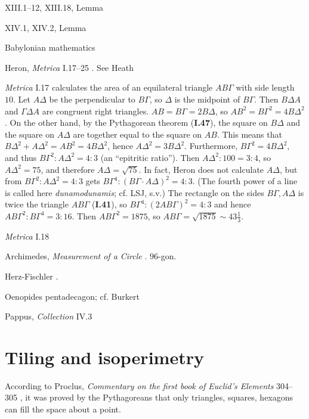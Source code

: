 \documentclass{article}
\begin{document}
XIII.1--12, XIII.18, Lemma

XIV.1, XIV.2, Lemma

Babylonian mathematics \cite{friberg}

Heron, {\em Metrica} I.17--25 \cite[pp.~190--]{metrica}. See Heath \cite[pp.~326--329]{HGMII}

{\em Metrica} I.17 calculates the area of an equilateral  triangle $AB\Gamma$ with side length $10$. 
Let $A\Delta$ be the perpendicular to $B\Gamma$, so $\Delta$ is the midpoint of $B\Gamma$. Then
$B\Delta A$ and $\Gamma \Delta A$ are congruent right triangles.
$AB=B\Gamma =2 B\Delta$,  so
$AB^2 = B\Gamma^2 = 4B\Delta^2$.
On the other hand,
by the Pythagorean theorem (\textbf{I.47}), the square on $B\Delta$ and the square
on $A \Delta$ are together equal to the square on $AB$. This means that
$B\Delta^2+A\Delta^2 = AB^2 = 4B\Delta^2$, hence
$A\Delta^2 = 3 B\Delta^2$.
Furthermore,  $B\Gamma^2=4B\Delta^2$, and thus
$B\Gamma^2 : A\Delta^2 = 4:3$ (an ``epitritic ratio'').
Then $A\Delta^2 : 100 = 3:4$, so $A\Delta^2 = 75$, and therefore $A\Delta = \sqrt{75}$. 
In fact, Heron does not calculate $A\Delta$, but from
$B\Gamma^2 : A\Delta^2 = 4:3$ gets 
$B\Gamma^4 : (B\Gamma \cdot A\Delta)^2 = 4:3$. (The fourth power of a line is called here {\em dunamodunamis}; cf. LSJ, s.v.)
The rectangle on the sides $B\Gamma,A\Delta$ is twice the triangle
$AB\Gamma$ (\textbf{I.41}), so 
$B\Gamma^4 : (2AB\Gamma)^2 = 4:3$ and hence
$AB\Gamma^2: B\Gamma^4  = 3:16$.
Then $AB{\Gamma}^2 = 1875$, so
$AB\Gamma = \sqrt{1875} \sim 43 \frac{1}{3}$. 

{\em Metrica} I.18



Archimedes, {\em Measurement of a Circle} \cite{archimedes}. $96$-gon.





Herz-Fischler \cite{herz-fischler}.

Oenopides \cite[p.~131, n.~4]{aristarchus} pentadecagon; cf. Burkert \cite[p.~453]{burkert}

Pappus, {\em Collection} IV.3 \cite[pp.~86--87]{pappusIV}







\section{Tiling and isoperimetry}
According to Proclus, {\em Commentary on the first book of Euclid's Elements} 304--305 \cite[p.~238]{proclus}, it was proved by the Pythagoreans that only triangles,
squares, hexagons can fill the space about a point.
\end{document}
